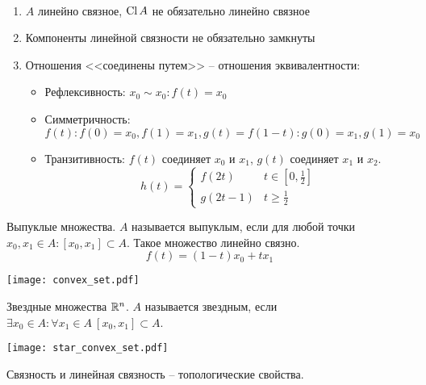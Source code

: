 \documentclass[main]{subfiles}
\begin{document}
\begin{remark}
    \

    \begin{enumerate}
        \item $A$ линейно связное, $\operatorname{Cl} A$ не обязательно линейно связное
        \item Компоненты линейной связности не обязательно замкнуты
        \item Отношения <<соединены путем>> -- отношения эквивалентности:
              \begin{itemize}
                  \item Рефлексивность: $x_0 \sim x_0: f(t) = x_0$
                  \item Симметричность: $f(t): f(0) = x_0, f(1) = x_1, g(t)= f(1-t): g(0) = x_1, g(1) = x_0$
                  \item Транзитивность: $f(t)$ соединяет $x_0$ и $x_1$, $g(t)$ соединяет $x_1$ и $x_2$.
                        \[h(t) = \begin{cases}
                                f(2t)   & t \in \left[0, \frac{1}{2}\right] \\
                                g(2t-1) & t \ge \frac{1}{2}
                            \end{cases}\]
              \end{itemize}
    \end{enumerate}
\end{remark}

\begin{example}
    Выпуклые множества. $A$ называется выпуклым, если для любой точки $x_0, x_1 \in A: [x_0, x_1] \subset A$.
    Такое множество линейно связно.
    \[f(t) = (1-t) x_0 + t x_1\]
    \begin{center}
        \texttt{[image: convex\_set.pdf]}
    \end{center}
\end{example}
\begin{example}
    Звездные множества $\mathbb{R}^n$.
    $A$ называется звездным, если $\exists x_0 \in A: \forall x_1 \in A\ [x_0, x_1] \subset A$.
    \begin{center}
        \texttt{[image: star\_convex\_set.pdf]}
    \end{center}
\end{example}

\begin{remark}
    Связность и линейная связность -- топологические свойства.
\end{remark}
\end{document}
